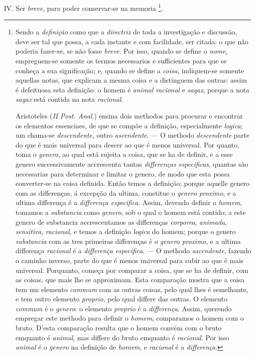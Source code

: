 IV. Ser \emph{breve}, para poder conservar-se na memoria \footnote{Sendo a \emph{definição} como que a \emph{directriz} de toda a investigação e discussão, deve ser tal que possa, a cada instante e com facilidade, ser citada: o que não poderia fazer-se, se não fosse \emph{breve}. Por isso, quando se define o \emph{nome}, empreguem-se somente os termos necessarios e sufficientes para que se conheça a sua significação; e, quando se define a \emph{coisa}, indiquem-se somente aquellas notas, que explicam a mesma coisa e a distinguem das outras: assim é defeituosa esta definição: o homem é \emph{animal racional} e \emph{sagaz}, porque a nota \emph{sagaz} está contida na nota \emph{racional}.\par Aristoteles (\emph{II Post. Anal.}) ensina dois methodos para procurar e encontrar os elementos essenciaes, de que se compõe a definição, especialmente \emph{logica}; um chama-se \emph{descendente}, outro \emph{ascendente}. --- O methodo \emph{descendente} parte do que é mais universal para descer ao que é menos universal. Por quanto, toma o \emph{genero}, ao qual está sujeita a coisa, que se ha de definir, e a esse genero successivamente accrescenta tantas \emph{differenças especificas}, quantas são necessarias para determinar e limitar o genero, de modo que esta possa converter-se na coisa definida. Então temos a definição; porque aquelle genero com as differenças, á excepção da ultima, constitue o \emph{genero proximo}, e a ultima differença é a \emph{differença especifica}. Assim, devendo definir o \emph{homem}, tomamos a \emph{substancia} como \emph{genero}, sob o qual o homem está contido; a este genero de substancia accrescentamos as differenças \emph{corporea}, \emph{animada}, \emph{sensitiva}, \emph{racional}, e temos a definição \emph{logica} do homem; porque o genero \emph{substancia} com as tres primeiras differenças é o \emph{genero proximo}, e a ultima differença \emph{racional} é a \emph{differença especifica}. --- O methodo \emph{ascendente}, fazendo o caminho inverso, parte do que é menos universal para subir ao que é mais universal. Porquanto, começa por comparar a coisa, que se ha de definir, com as coisas, que mais lhe se approximam. Esta comparação mostra que a coisa tem um elemento \emph{commum} com as outras coisas, pelo qual lhes é semelhante, e tem outro elemento \emph{proprio}, pelo qual differe das outras. O elemento \emph{commum} é o \emph{genero}: o elemento \emph{proprio} é a \emph{differença}. Assim, querendo empregar este methodo para definir o \emph{homem}, comparamos o homem com o bruto. D'esta comparação resulta que o homem convém com o bruto emquanto é \emph{animal}, mas differe do bruto emquanto é \emph{racional}. Por isso \emph{animal} é o \emph{genero} na definição de \emph{homem}, e \emph{racional} é a \emph{differença}.}.

